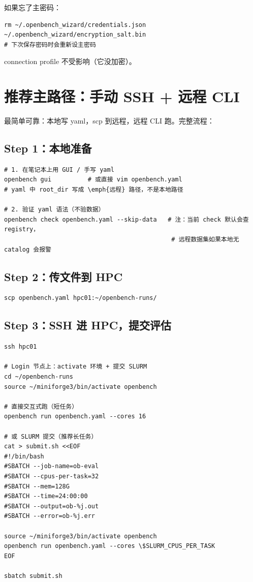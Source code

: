 如果忘了主密码：

\begin{verbatim}
rm ~/.openbench_wizard/credentials.json ~/.openbench_wizard/encryption_salt.bin
# 下次保存密码时会重新设主密码
\end{verbatim}

connection profile 不受影响（它没加密）。

\section{推荐主路径：手动 SSH + 远程 CLI}

最简单可靠：本地写 yaml，scp 到远程，远程 CLI 跑。完整流程：

\subsection{Step 1：本地准备}

\begin{verbatim}
# 1. 在笔记本上用 GUI / 手写 yaml
openbench gui          # 或直接 vim openbench.yaml
# yaml 中 root_dir 写成 \emph{远程} 路径，不是本地路径

# 2. 验证 yaml 语法（不验数据）
openbench check openbench.yaml --skip-data   # 注：当前 check 默认会查 registry，
                                              # 远程数据集如果本地无 catalog 会报警
\end{verbatim}

\subsection{Step 2：传文件到 HPC}

\begin{verbatim}
scp openbench.yaml hpc01:~/openbench-runs/
\end{verbatim}

\subsection{Step 3：SSH 进 HPC，提交评估}

\begin{verbatim}
ssh hpc01

# Login 节点上：activate 环境 + 提交 SLURM
cd ~/openbench-runs
source ~/miniforge3/bin/activate openbench

# 直接交互式跑（短任务）
openbench run openbench.yaml --cores 16

# 或 SLURM 提交（推荐长任务）
cat > submit.sh <<EOF
#!/bin/bash
#SBATCH --job-name=ob-eval
#SBATCH --cpus-per-task=32
#SBATCH --mem=128G
#SBATCH --time=24:00:00
#SBATCH --output=ob-%j.out
#SBATCH --error=ob-%j.err

source ~/miniforge3/bin/activate openbench
openbench run openbench.yaml --cores \$SLURM_CPUS_PER_TASK
EOF

sbatch submit.sh
\end{verbatim}

